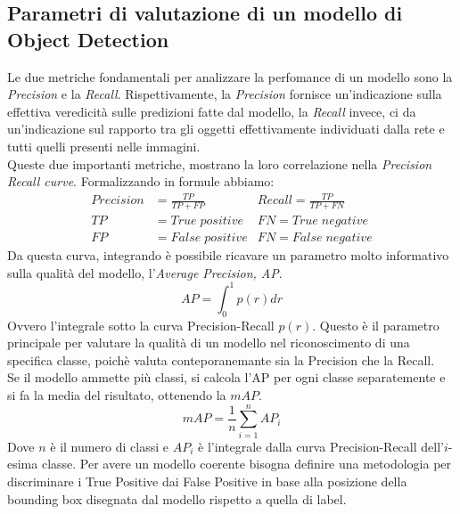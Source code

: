 \documentclass[12pt,a4paper,openright,twoside]{report}
\begin{document}
\subsection{Parametri di valutazione di un modello di Object Detection}
Le due metriche fondamentali per analizzare la perfomance di un modello sono la \emph{Precision} e la \emph{Recall}.
Rispettivamente, la \emph{Precision} fornisce un'indicazione sulla effettiva veredicità sulle predizioni fatte dal modello, la \emph{Recall} invece, ci da un'indicazione sul rapporto tra gli oggetti effettivamente individuati dalla rete e tutti quelli presenti nelle immagini.\\
Queste due importanti metriche, mostrano la loro correlazione nella \emph{Precision Recall curve}.
Formalizzando in formule abbiamo: 
\begin{align*}
Precision& = \frac{TP}{TP + FP}          &  Recall = \frac{TP}{TP + FN} \\
TP& = True \; positive    &  FN = True \; negative\\
FP& = False \; positive    &  FN = False \; negative
\end{align*}
Da questa curva, integrando è possibile ricavare un parametro molto informativo sulla qualità del modello, l'\emph{Average Precision, AP}.
\begin{equation}
    AP = \int_{0}^{1} p(r)dr
\end{equation}
Ovvero l'integrale sotto la curva Precision-Recall $p(r)$. Questo è il parametro principale per valutare la qualità di un modello nel riconoscimento di una specifica classe, poichè valuta conteporanemante sia la Precision che la Recall. \\
Se il modello ammette più classi, si calcola l'AP per ogni classe separatemente e si fa la media del risultato, ottenendo la $mAP$.
\begin{equation}
    mAP = \frac{1}{n}\sum_{i=1}^{n}AP_{i}
\end{equation}
Dove $n$ è il numero di classi e $AP_{i}$ è l'integrale dalla curva Precision-Recall dell'$i$-esima classe.
Per avere un modello coerente bisogna definire una metodologia per discriminare i True Positive dai False Positive in base alla posizione della bounding box disegnata dal modello rispetto a quella di label. \\
\end{document}
